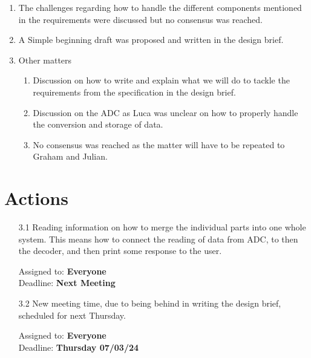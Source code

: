 \documentclass{cce2014-meetings}
\begin{document}
\begin{enumerate}
\item The challenges regarding how to handle the different components mentioned in the requirements were discussed but no consensus was reached.

\item A Simple beginning draft was proposed and written in the design brief.

\item Other matters
   \begin{enumerate}
   \item Discussion on how to write and explain what we will do to tackle the requirements from the specification in the design brief.
   \item Discussion on the ADC as Luca was unclear on how to properly handle the conversion and storage of data.
   \item No consensus was reached as the matter will have to be repeated to Graham and Julian.
   \end{enumerate}

\end{enumerate}

\section*{Actions}

\begin{enumerate}

\item [3.1] Reading information on how to merge the individual parts into one whole system. This means how to connect the reading of data from ADC, to then the decoder, and then print some response to the user.
\begin{flushright}
Assigned to: \textbf{Everyone} \\
Deadline: \textbf{Next Meeting}
\end{flushright}

\item [3.2] New meeting time, due to being behind in writing the design brief, scheduled for next Thursday.
\begin{flushright}
Assigned to: \textbf{Everyone} \\
Deadline: \textbf{Thursday 07/03/24}
\end{flushright}

\end{enumerate}
\end{document}
